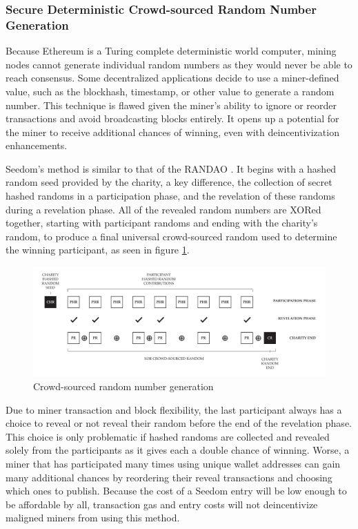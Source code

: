 \documentclass[11pt]{article}
\begin{document}
\subsubsection{Secure Deterministic Crowd-sourced Random Number Generation}

Because Ethereum is a Turing complete deterministic world computer, mining nodes cannot generate individual random numbers as they would never be able to reach consensus. Some decentralized applications decide to use a miner-defined value, such as the blockhash, timestamp, or other value to generate a random number. This technique is flawed given the miner's ability to ignore or reorder transactions and avoid broadcasting blocks entirely. It opens up a potential for the miner to receive additional chances of winning, even with deincentivization enhancements.

Seedom's method is similar to that of the RANDAO \cite{2}. It begins with a hashed random seed provided by the charity, a key difference, the collection of secret hashed randoms in a participation phase, and the revelation of these randoms during a revelation phase. All of the revealed random numbers are XORed together, starting with participant randoms and ending with the charity's random, to produce a final universal crowd-sourced random used to determine the winning participant, as seen in figure \ref{figure:crowdsourcedRandomNumberGeneration}.

\begin{figure}[H]
\begin{center}
\includegraphics[width=1.0\textwidth]{crowdsourcedRandomNumberGeneration.pdf}
\caption{Crowd-sourced random number generation}
\label{figure:crowdsourcedRandomNumberGeneration}
\end{center}
\end{figure}

Due to miner transaction and block flexibility, the last participant always has a choice to reveal or not reveal their random before the end of the revelation phase. This choice is only problematic if hashed randoms are collected and revealed solely from the participants as it gives each a double chance of winning. Worse, a miner that has participated many times using unique wallet addresses can gain many additional chances by reordering their reveal transactions and choosing which ones to publish. Because the cost of a Seedom entry will be low enough to be affordable by all, transaction gas and entry costs will not deincentivize maligned miners from using this method.
\end{document}
